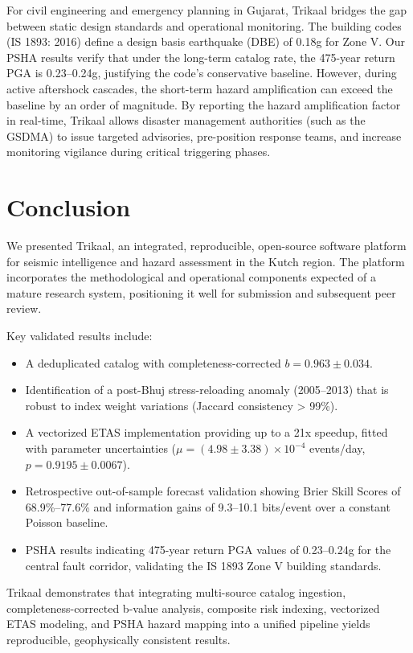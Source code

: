 \documentclass[journal]{IEEEtran}
\begin{document}
For civil engineering and emergency planning in Gujarat, Trikaal bridges the gap between static design standards and operational monitoring. The building codes (IS 1893: 2016) define a design basis earthquake (DBE) of 0.18g for Zone V. Our PSHA results verify that under the long-term catalog rate, the 475-year return PGA is 0.23–0.24g, justifying the code's conservative baseline. However, during active aftershock cascades, the short-term hazard amplification can exceed the baseline by an order of magnitude. By reporting the hazard amplification factor in real-time, Trikaal allows disaster management authorities (such as the GSDMA) to issue targeted advisories, pre-position response teams, and increase monitoring vigilance during critical triggering phases.

\section{Conclusion}
We presented Trikaal, an integrated, reproducible, open-source software platform for seismic intelligence and hazard assessment in the Kutch region. The platform incorporates the methodological and operational components expected of a mature research system, positioning it well for submission and subsequent peer review.

Key validated results include:
\begin{itemize}
  \item A deduplicated catalog with completeness-corrected $b = 0.963 \pm 0.034$.
  \item Identification of a post-Bhuj stress-reloading anomaly (2005–2013) that is robust to index weight variations (Jaccard consistency > 99\%).
  \item A vectorized ETAS implementation providing up to a 21x speedup, fitted with parameter uncertainties ($\mu = (4.98 \pm 3.38) \times 10^{-4}$ events/day, $p = 0.9195 \pm 0.0067$).
  \item Retrospective out-of-sample forecast validation showing Brier Skill Scores of 68.9\%–77.6\% and information gains of 9.3–10.1 bits/event over a constant Poisson baseline.
  \item PSHA results indicating 475-year return PGA values of 0.23–0.24g for the central fault corridor, validating the IS 1893 Zone V building standards.
\end{itemize}

Trikaal demonstrates that integrating multi-source catalog ingestion, completeness-corrected b-value analysis, composite risk indexing, vectorized ETAS modeling, and PSHA hazard mapping into a unified pipeline yields reproducible, geophysically consistent results.
\end{document}
